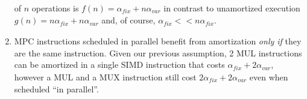 \begin{enumerate}
of $n$ operations is $f(n) = \alpha_\mathit{fix} + n\alpha_{var}$ in contrast to unamortized execution $g(n) = n\alpha_\mathit{fix} + n\alpha_{var}$ and, of course,
$\alpha_\mathit{fix} << n\alpha_\mathit{fix}$.
\item MPC instructions scheduled in parallel benefit from amortization \emph{only if} they are the same instruction. Given our previous assumption,
2 MUL instructions can be amortized in a single SIMD instruction that costs $\alpha_\mathit{fix} + 2\alpha_\mathit{var}$, however a MUL and a MUX instruction
still cost $2\alpha_\mathit{fix} + 2\alpha_\mathit{var}$ even when scheduled ``in parallel''.
\end{enumerate}


